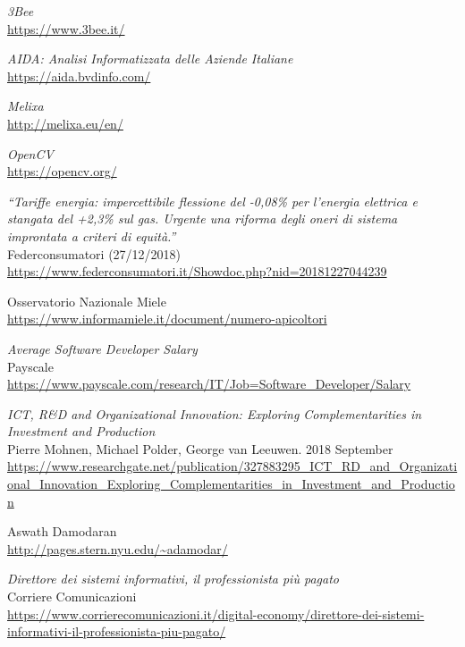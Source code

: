 \newpage
\begin{thebibliography}{99}


\emph{3Bee} \\
\url{https://www.3bee.it/
}

\emph{AIDA: Analisi Informatizzata delle Aziende Italiane} \\
\url{https://aida.bvdinfo.com/}

\emph{Melixa} \\
\url{http://melixa.eu/en/}

\emph{OpenCV} \\
\url{https://opencv.org/}

\emph{``Tariffe energia: impercettibile flessione del -0,08\% per l’energia
elettrica e stangata del +2,3\% sul gas. Urgente una riforma degli oneri di
sistema improntata a criteri di equità.''} \\
Federconsumatori (27/12/2018) \\
\url{https://www.federconsumatori.it/Showdoc.php?nid=20181227044239}

Osservatorio Nazionale Miele \\
\url{https://www.informamiele.it/document/numero-apicoltori}

\emph{Average Software Developer Salary} \\
Payscale \\
\url{https://www.payscale.com/research/IT/Job=Software_Developer/Salary}

\emph{ICT, R\&D and Organizational Innovation: Exploring Complementarities in
Investment and Production} \\
Pierre Mohnen, Michael Polder, George van Leeuwen. 2018 September\\
\url{https://www.researchgate.net/publication/327883295_ICT_RD_and_Organizational_Innovation_Exploring_Complementarities_in_Investment_and_Production}

Aswath Damodaran\\
\url{http://pages.stern.nyu.edu/~adamodar/}

\emph{Direttore dei sistemi informativi, il professionista più pagato} \\
Corriere Comunicazioni \\
\url{https://www.corrierecomunicazioni.it/digital-economy/direttore-dei-sistemi-informativi-il-professionista-piu-pagato/}


\end{thebibliography}
